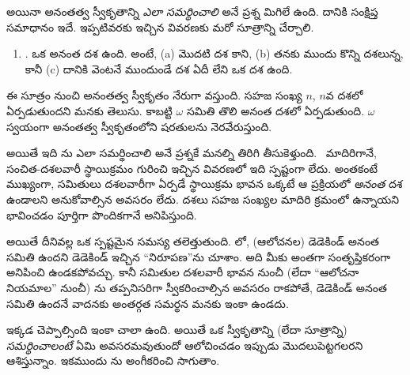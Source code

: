 \documentclass[../../../include/open-logic-section]{subfiles}
\begin{document}
అయినా అనంతత్వ స్వీకృతాన్ని
\emph{ఎలా సమర్థించాలి}
అనే ప్రశ్న మిగిలే ఉంది.
దానికి సంక్షిప్త సమాధానం ఇదే. ఇప్పటివరకు ఇచ్చిన
వివరణకు మరో సూత్రాన్ని చేర్చాలి.
\begin{enumerate}
	\item[] \stagesinf. ఒక అనంత దశ ఉంది. అంటే, (a) మొదటి దశ కాని, (b) తనకు ముందు కొన్ని దశలున్న, కానీ (c) దానికి వెంటనే ముందుండే దశ ఏదీ లేని ఒక దశ ఉంది.
\end{enumerate}
ఈ సూత్రం నుంచి అనంతత్వ
స్వీకృతం నేరుగా వస్తుంది.
సహజ సంఖ్య $n$,
$n$వ దశలో ఏర్పడుతుందని
మనకు తెలుసు. కాబట్టి
$\omega$ సమితి తొలి
అనంత దశలో ఏర్పడుతుంది.
$\omega$ స్వయంగా
అనంతత్వ స్వీకృతంలోని షరతులను
నెరవేరుస్తుంది.

అయితే ఇది \stagesinf{}ను
ఎలా సమర్థించాలి అనే
ప్రశ్నకే మనల్ని తిరిగి
తీసుకెళ్తుంది.
\stagessucc\ మాదిరిగానే,
సంచిత-దశలవారీ
స్థాయిక్రమం గురించి ఇచ్చిన వివరణలో
ఇది స్పష్టంగా లేదు.
అంతకంటే ముఖ్యంగా,
సమితులు దశలవారీగా
ఏర్పడే స్థాయిక్రమ భావన
ఒక్కటే ఆ ప్రక్రియలో
\emph{అనంత} దశ ఉండాలని
అనుకోవాల్సిన అవసరం లేదు. దశలు
సహజ సంఖ్యల మాదిరి
క్రమంలో ఉన్నాయని
భావించడం పూర్తిగా
పొందికగానే అనిపిస్తుంది.

అయితే దీనివల్ల ఒక
స్పష్టమైన సమస్య
తలెత్తుతుంది.
లో,
(ఆలోచనల) డెడెకిండ్
అనంత సమితి ఉందని
డెడెకిండ్ ఇచ్చిన
``నిరూపణ''ను చూశాం.
అది మీకు అంతగా
సంతృప్తికరంగా అనిపించి
ఉండకపోవచ్చు. కానీ
సమితుల దశలవారీ భావన నుంచీ
(లేదా ``ఆలోచనా
నియమాల'' నుంచీ) \stagesinf{}ను
తప్పనిసరిగా స్వీకరించాల్సిన అవసరం
రాకపోతే, డెడెకిండ్
అనంత సమితి ఉందనే
వాదనకు అంతర్గత
సమర్థన మనకు ఇంకా
ఉండదు.

ఇక్కడ చెప్పాల్సింది
ఇంకా చాలా ఉంది.
అయితే ఒక స్వీకృతాన్ని
(లేదా సూత్రాన్ని)
\emph{సమర్థించాలంటే}
ఏమి అవసరమవుతుందో
ఆలోచించడం ఇప్పుడు
మొదలుపెట్టగలరని
ఆశిస్తున్నాం.
ఇకముందు \stagesinf{}ను
అంగీకరించి సాగుతాం.
\end{document}
